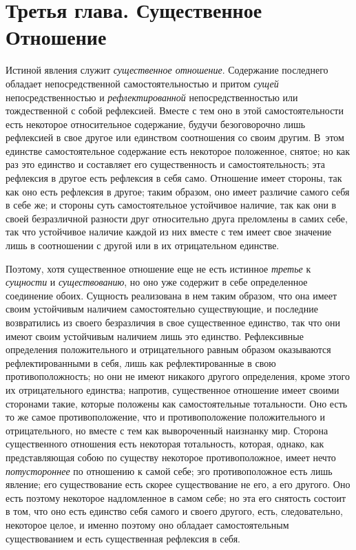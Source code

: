 \chapter[{\em Третья глава} Существенное Отношение]
{Третья глава. Существенное Отношение}

Истиной явления служит {\em существенное отношение}. Содержание последнего
обладает непосредственной самостоятельностью и притом {\em сущей}
непосредственностью и {\em рефлектированной} непосредственностью или
тождественной с собой рефлексией. Вместе с тем оно в этой самостоятельности
есть некоторое относительное содержание, будучи безоговорочно лишь
рефлексией в свое другое или единством соотношения со своим другим. В~этом
единстве самостоятельное содержание есть некоторое положенное, снятое; но
как раз это единство и составляет его существенность и самостоятельность;
эта рефлексия в другое есть рефлексия в себя само. Отношение имеет стороны,
так как оно есть рефлексия в другое; таким образом, оно имеет различие
самого себя в себе же; и стороны суть самостоятельное устойчивое наличие,
так как они в своей безразличной разности друг относительно друга преломлены
в самих себе, так что устойчивое наличие каждой из них вместе с тем имеет
свое значение лишь в соотношении с другой или в их отрицательном единстве.

Поэтому, хотя существенное отношение еще не есть истинное {\em третье}
к {\em сущности} и {\em существованию}, но оно уже содержит в себе
определенное соединение обоих. Сущность реализована в нем таким образом,
что она имеет своим устойчивым наличием самостоятельно существующие, и
последние возвратились из своего безразличия в свое существенное единство,
так что они имеют своим устойчивым наличием лишь это единство. Рефлексивные
определения положительного и отрицательного равным образом оказываются
рефлектированными в себя, лишь как рефлектированные в свою
противоположность; но они не имеют никакого другого определения, кроме
этого их отрицательного единства; напротив, существенное отношение имеет
своими сторонами такие, которые положены как самостоятельные тотальности.
Оно есть то же самое противоположение, что и противоположение
положительного и отрицательного, но вместе с тем как вывороченный наизнанку
мир. Сторона существенного отношения есть некоторая тотальность, которая,
однако, как представляющая собою по существу некоторое противоположное,
имеет нечто {\em потустороннее} по отношению к самой
себе; эго противоположное есть лишь явление; его существование есть скорее
существование не его, а его другого. Оно есть поэтому некоторое
надломленное в самом себе; но эта его снятость состоит в том, что оно есть
единство себя самого и своего другого, есть, следовательно, некоторое
целое, и именно поэтому оно обладает самостоятельным существованием и есть
существенная рефлексия в себя.

